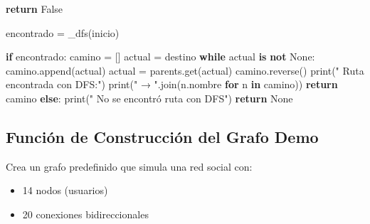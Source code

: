 \documentclass[
  spanish,
  letterpaper,
  DIV=11,
  numbers=noendperiod]{scrartcl}
\newenvironment{Shaded}{\begin{snugshade}}{\end{snugshade}}
\newcommand{\BuiltInTok}[1]{\textcolor[rgb]{0.00,0.23,0.31}{#1}}
\newcommand{\ControlFlowTok}[1]{\textcolor[rgb]{0.00,0.23,0.31}{\textbf{#1}}}
\newcommand{\KeywordTok}[1]{\textcolor[rgb]{0.00,0.23,0.31}{\textbf{#1}}}
\newcommand{\NormalTok}[1]{\textcolor[rgb]{0.00,0.23,0.31}{#1}}
\newcommand{\OperatorTok}[1]{\textcolor[rgb]{0.37,0.37,0.37}{#1}}
\newcommand{\StringTok}[1]{\textcolor[rgb]{0.13,0.47,0.30}{#1}}
\newcommand{\VariableTok}[1]{\textcolor[rgb]{0.07,0.07,0.07}{#1}}
\begin{document}
\begin{Shaded}
\begin{Highlighting}[]
            \ControlFlowTok{return} \VariableTok{False}

\NormalTok{        encontrado }\OperatorTok{=}\NormalTok{ \_dfs(inicio)}

        \ControlFlowTok{if}\NormalTok{ encontrado:}
\NormalTok{            camino }\OperatorTok{=}\NormalTok{ []}
\NormalTok{            actual }\OperatorTok{=}\NormalTok{ destino}
            \ControlFlowTok{while}\NormalTok{ actual }\KeywordTok{is} \KeywordTok{not} \VariableTok{None}\NormalTok{:}
\NormalTok{                camino.append(actual)}
\NormalTok{                actual }\OperatorTok{=}\NormalTok{ parents.get(actual)}
\NormalTok{            camino.reverse()}
            \BuiltInTok{print}\NormalTok{(}\StringTok{" Ruta encontrada con DFS:"}\NormalTok{)}
            \BuiltInTok{print}\NormalTok{(}\StringTok{" → "}\NormalTok{.join(n.nombre }\ControlFlowTok{for}\NormalTok{ n }\KeywordTok{in}\NormalTok{ camino))}
            \ControlFlowTok{return}\NormalTok{ camino}
        \ControlFlowTok{else}\NormalTok{:}
            \BuiltInTok{print}\NormalTok{(}\StringTok{" No se encontró ruta con DFS"}\NormalTok{)}
            \ControlFlowTok{return} \VariableTok{None}
\end{Highlighting}
\end{Shaded}

\subsection{Función de Construcción del Grafo
Demo}\label{funciuxf3n-de-construcciuxf3n-del-grafo-demo}

Crea un grafo predefinido que simula una red social con:

\begin{itemize}
\item
  14 nodos (usuarios)
\item
  20 conexiones bidireccionales
\end{itemize}
\end{document}
